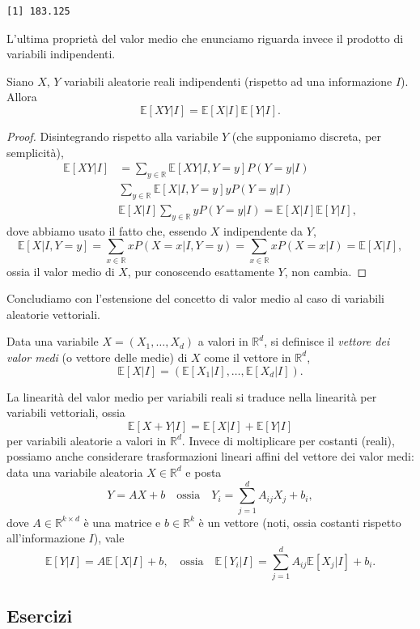 \documentclass[
  italian,
  letterpaper,
]{book}
\newcommand{\sqa}[1]{\left[ #1 \right]}
\newcommand{\R}{\mathbb{R}}
\newcommand{\E}[1]{\mathbb{E}\sqa{#1}}
\theoremstyle{definition}
\theoremstyle{remark}
\begin{document}
\begin{verbatim}
[1] 183.125
\end{verbatim}

L'ultima proprietà del valor medio che enunciamo riguarda invece il
prodotto di variabili indipendenti.

Siano \(X\), \(Y\) variabili aleatorie reali indipendenti (rispetto ad
una informazione \(I\)). Allora \[ \E{ XY |I} = \E{X|I} \E{Y|I}.\]

\begin{proof}
Disintegrando rispetto alla variabile \(Y\) (che supponiamo discreta,
per semplicità),
\[ \begin{split} \E{ XY |I} & = \sum_{y \in \R} \E{XY|I, Y=y} P(Y=y|I)\\
& \sum_{y \in \R} \E{X|I, Y=y} y P(Y=y|I)\\
& \E{X|I}\sum_{y \in \R}  y P(Y=y|I) = \E{X|I}\E{Y|I},\end{split}\] dove
abbiamo usato il fatto che, essendo \(X\) indipendente da \(Y\),
\[ \E{X|I, Y=y} = \sum_{x \in \R} x P(X=x|I, Y=y) = \sum_{x\in \R} x P(X=x|I) = \E{X|I},\]
ossia il valor medio di \(X\), pur conoscendo esattamente \(Y\), non
cambia.
\end{proof}

Concludiamo con l'estensione del concetto di valor medio al caso di
variabili aleatorie vettoriali.

Data una variabile \(X = (X_1, \ldots, X_d)\) a valori in \(\R^d\), si
definisce il \emph{vettore dei valor medi} (o vettore delle medie) di
\(X\) come il vettore in \(\R^d\),
\[ \E{X|I} =( \E{X_1|I}, \ldots, \E{X_d|I}).\]

La linearità del valor medio per variabili reali si traduce nella
linearità per variabili vettoriali, ossia
\[ \E{X+Y|I} = \E{X|I} + \E{Y|I}\] per variabili aleatorie a valori in
\(\R^d\). Invece di moltiplicare per costanti (reali), possiamo anche
considerare trasformazioni lineari affini del vettore dei valor medi:
data una variabile aleatoria \(X\in \R^d\) e posta
\[ Y = AX+b \quad \text{ossia} \quad Y_i = \sum_{j=1}^d A_{ij} X_j + b_i,\]
dove \(A \in \R^{k \times d}\) è una matrice e \(b \in \R^k\) è un
vettore (noti, ossia costanti rispetto all'informazione \(I\)), vale
\[ \E{Y|I} = A \E{X|I}+b, \quad \text{ossia} \quad \E{Y_i|I} =  \sum_{j=1}^d A_{ij}\E{X_j|I} + b_i.\]

\subsection{Esercizi}\label{esercizi-19}
\end{document}

